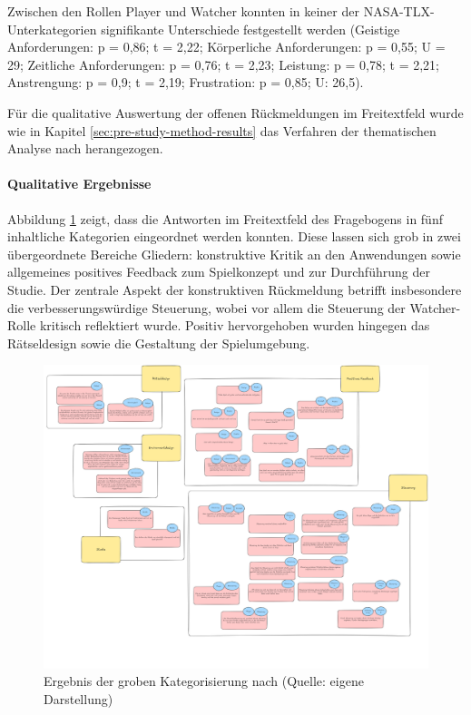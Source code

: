 Zwischen den Rollen Player und Watcher konnten in keiner der \ac{NASA-TLX}-Unterkategorien signifikante Unterschiede festgestellt werden (Geistige Anforderungen: p = 0,86; t = 2,22; Körperliche Anforderungen: p = 0,55; U = 29; Zeitliche Anforderungen: p = 0,76; t = 2,23; Leistung: p = 0,78; t = 2,21; Anstrengung: p = 0,9; t = 2,19; Frustration: p = 0,85; U: 26,5).

Für die qualitative Auswertung der offenen Rückmeldungen im Freitextfeld  wurde wie in Kapitel \ref{sec:pre-study-method-results} das Verfahren der thematischen Analyse nach \cite{braun_using_2006} herangezogen.

\paragraph{Qualitative Ergebnisse}

Abbildung \ref{fig:qualitative-results} zeigt, dass die Antworten im Freitextfeld des Fragebogens in fünf inhaltliche Kategorien eingeordnet werden konnten. Diese lassen sich grob in zwei übergeordnete Bereiche Gliedern: konstruktive Kritik an den Anwendungen sowie allgemeines positives Feedback zum Spielkonzept und zur Durchführung der Studie. Der zentrale Aspekt der konstruktiven Rückmeldung betrifft insbesondere die verbesserungswürdige Steuerung, wobei vor allem die Steuerung der Watcher-Rolle kritisch reflektiert wurde. Positiv hervorgehoben wurden hingegen das Rätseldesign sowie die Gestaltung der Spielumgebung.

\begin{figure}[ht]
\centering
\includegraphics[width=1\linewidth]{content/pictures/Qualitative-Auswertung-Schritt-1.png}
\caption{Ergebnis der groben Kategorisierung nach \cite{braun_using_2006} (Quelle: eigene Darstellung)}
\label{fig:qualitative-results}
\end{figure}

